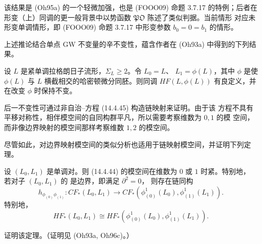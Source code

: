 该结果是 (Oh95a) 的一个轻微加强，也是 (FOOO09) 命题 3.7.17 的特例；后者在形变\personFloer{}（上）同调的更一般背景中以势函数 $\mathfrak{PO}$ 陈述了类似判据。当前情形
对应未形变单调情形，即 (FOOO09) 命题 3.7.17 中形变参数 $b_0=0=b_1$ 的情形。

上述推论结合单点 GW 不变量的辛不变性，蕴含作者在 (Oh93a) 中得到的下列结果。

\begin{theorem}
\label{thm:hamiltonian-image-monotone-floer-invariance}
设 $L$ 是紧单调拉格朗日子流形，$\Sigma_L\geq2$。令 $L_0=L$、
$L_1=\phi(L)$，其中 $\phi$ 是使 $\phi(L)$ 与 $L$ 横截相交的哈密顿微分同胚。则\personFloer{}同调 $HF(L,\phi(L))$ 有良定义，并在改变 $\phi$ 时保持不变。
\end{theorem}

后一不变性可通过非自治\personCauchy{}--\personRiemann{}方程 (14.4.45) 构造链映射来证明。由于该
方程不具有平移对称性，相伴模空间的自同构群平凡，所以需要考察维数为 $0,1$ 的模
空间，而非像\personFloer{}边界映射的模空间那样考察维数 $1,2$ 的模空间。

尽管如此，对边界映射模空间的类似分析也适用于链映射模空间，并证明下列定理。

\begin{theorem}
\label{thm:monotone-continuation-chain-isomorphism}
设 $(L_0,L_1)$ 是单调对。则 (14.4.44) 的模空间在维数为 $0$ 或 $1$ 时紧。特别地，
若对子 $(L_0,L_1)$ 的\personFloer{} \termPreBoundaryMap{}是边界，即满足 $\partial^2=0$，
则存在链同构
\[
 h_{\phi_{(0)}\phi_{(1)}}:CF_*(L_0,L_1)
 \longrightarrow CF_*(\phi_{(0)}^1(L_0),\phi_{(1)}^1(L_1)).
\]
特别地，
\[
 HF_*(L_0,L_1)
 \cong HF_*(\phi_{(0)}^1(L_0),\phi_{(1)}^1(L_1)).
\]
\end{theorem}

\begin{exercise}
\label{ex:prove-monotone-chain-isomorphism}
证明该定理。（证明见 (Oh93a, Oh96c)。）
\end{exercise}
